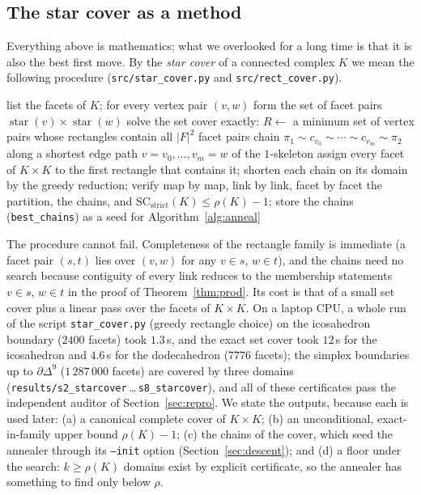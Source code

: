\documentclass[12pt]{article}
\newcommand{\SC}{\mathrm{SC}}
\newcommand{\SCst}{\SC_{\mathrm{strict}}}
\begin{document}
\subsection{The star cover as a method}\label{sec:starmethod}

Everything above is mathematics; what we overlooked for a long time is
that it is also the best first move.  By the \emph{star cover} of a
connected complex $K$ we mean the following procedure
(\texttt{src/star\_cover.py} and \texttt{src/rect\_cover.py}).

\begin{algorithm}[H]
\caption{\textsc{StarCover}($K$): a complete, verified system of
planners with no search.}
\label{alg:star}
\begin{algorithmic}[1]
\State list the facets of $K$; for every vertex pair $(v,w)$ form the
set of facet pairs $\operatorname{star}(v)\times\operatorname{star}(w)$
\State solve the set cover exactly: $R\gets$ a minimum set of vertex
pairs whose rectangles contain all $|F|^2$ facet pairs
  \State chain $\pi_1\sim c_{v_0}\sim\cdots\sim c_{v_m}\sim\pi_2$ along a
  shortest edge path $v=v_0,\dots,v_m=w$ of the $1$-skeleton
\EndFor
\State assign every facet of $K\times K$ to the first rectangle that
contains it; shorten each chain on its domain by the greedy reduction;
verify map by map, link by link, facet by facet
\State \Return the partition, the chains, and $\SCst(K)\le\rho(K)-1$;
store the chains (\texttt{best\_chains}) as a seed for
Algorithm~\ref{alg:anneal}
\end{algorithmic}
\end{algorithm}

The procedure cannot fail.  Completeness of the rectangle family is
immediate (a facet pair $(s,t)$ lies over $(v,w)$ for any $v\in s$,
$w\in t$), and the chains need no search because contiguity of every link
reduces to the membership statements $v\in s$, $w\in t$ in the proof of
Theorem~\ref{thm:prod}.  Its cost is that of a small set cover plus a
linear pass over the facets of $K\times K$.  On a laptop CPU, a whole
run of the script \texttt{star\_cover.py} (greedy rectangle choice) on the
icosahedron boundary ($2400$ facets) took $1.3$\,s, and the exact set cover took $12$\,s
for the icosahedron and $4.6$\,s for the dodecahedron ($7776$ facets);
the simplex boundaries up to $\partial\Delta^9$ ($1\,287\,000$ facets)
are covered by three domains
(\texttt{results/s2\_starcover}\,\dots\,\texttt{s8\_starcover}), and all
of these certificates pass the independent auditor of
Section~\ref{sec:repro}.  We state the outputs, because each is used
later: (a) a canonical complete cover of $K\times K$; (b) an
unconditional, exact-in-family upper bound $\rho(K)-1$; (c) the chains
of the cover, which seed the annealer through its \texttt{--init}
option (Section~\ref{sec:descent}); and (d) a floor under the search:
$k\ge\rho(K)$ domains exist by explicit certificate, so the annealer
has something to find only below $\rho$.
\end{document}
